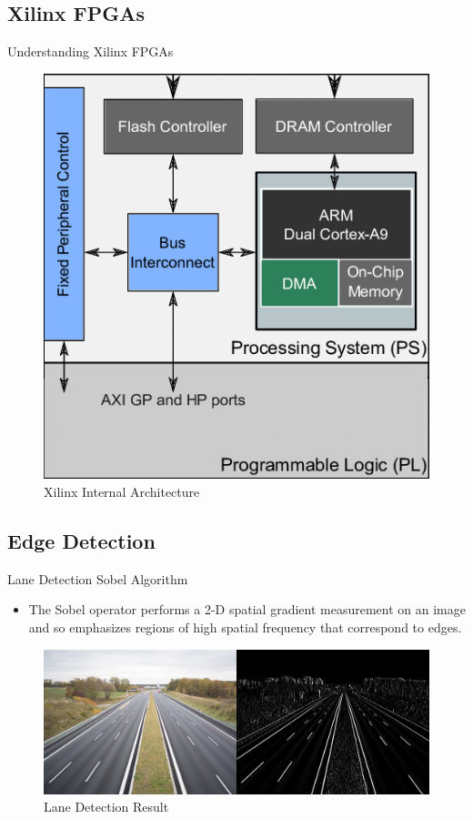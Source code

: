 \documentclass[10pt, a4paper]{beamer}
\begin{document}
\subsection{Xilinx FPGAs}
\begin{frame}{Understanding Xilinx FPGAs}
	\begin{figure}
		\centering
		\includegraphics[scale=0.40]{xilinx-fpga}
		\caption{Xilinx Internal Architecture}
	\end{figure}
\end{frame}

\subsection{Edge Detection}
\begin{frame}{Lane Detection}
	Sobel Algorithm
	\begin{itemize}
		\item \justifying The Sobel operator performs a 2-D spatial gradient measurement on an image and so emphasizes regions of high spatial frequency that correspond to edges.
	\end{itemize}
	\begin{figure}
		\centering
		\includegraphics[scale=0.20]{laneresult}
		\caption{Lane Detection Result}
	\end{figure}
\end{frame}
\end{document}

